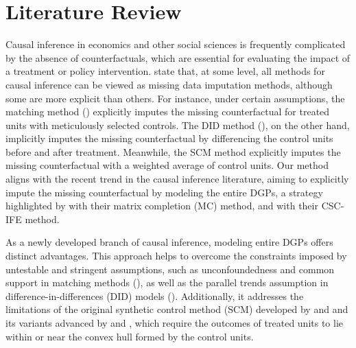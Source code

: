 \documentclass[12pt]{article}
\begin{document}
\section{Literature Review} 
\label{sec: literature}
Causal inference in economics and other social sciences is frequently complicated by the absence of counterfactuals, which are essential for evaluating the impact of a treatment or policy intervention. \cite{imbens2015causal} state that, at some level, all methods for causal inference can be viewed as missing data imputation methods, although some are more explicit than others. For instance, under certain assumptions, the matching method (\cite{abadie2006large, abadie2011bias}) explicitly imputes the missing counterfactual for treated units with meticulously selected controls. The DID method (\cite{card1993minimum, ashenfelter1978estimating}), on the other hand, implicitly imputes the missing counterfactual by differencing the control units before and after treatment. Meanwhile, the SCM method explicitly imputes the missing counterfactual with a weighted average of control units. Our method aligns with the recent trend in the causal inference literature, aiming to explicitly impute the missing counterfactual by modeling the entire DGPs, a strategy highlighted by \cite{athey2021matrix} with their matrix completion (MC) method, and \cite{xu2017generalized} with their CSC-IFE method.

As a newly developed branch of causal inference, modeling entire DGPs offers distinct advantages. This approach helps to overcome the constraints imposed by untestable and stringent assumptions, such as unconfoundedness and common support in matching methods (\cite{rosenbaum1983central, rubin1997estimating}), as well as the parallel trends assumption in difference-in-differences (DID) models (\cite{card1993minimum}). Additionally, it addresses the limitations of the original synthetic control method (SCM) developed by \cite{abadie2006large} and \cite{abadie2010synthetic} and its variants advanced by \cite{ben2021augmented} and \cite{arkhangelsky2021synthetic}, which require the outcomes of treated units to lie within or near the convex hull formed by the control units.
\end{document}
